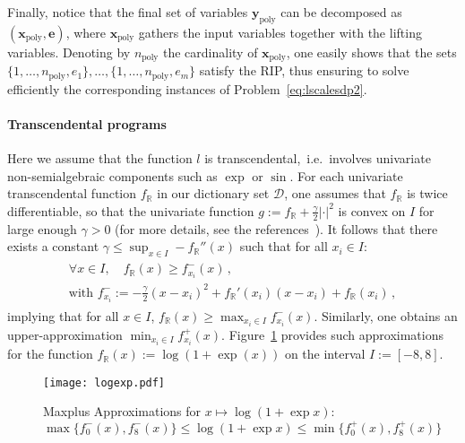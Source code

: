 \documentclass[preprint,fleqn,nocopyrightspace]{sigplanconf}
\newcommand{\setD}{\mathcal{D}} %
\newcommand{\R}{\mathbb{R}}
\newcommand{\x}{\mathbf{x}}
\newcommand{\e}{\mathbf{e}}
\newcommand{\y}{\mathbf{y}}
\newcommand{\poly}{_\text{poly}}
\theoremstyle{plain}
\begin{document}
Finally, notice that the final set of variables $\y\poly$ can be decomposed as $(\x\poly, \e)$, where $\x\poly$ gathers the input variables together with the lifting variables.  
Denoting by $n\poly$ the cardinality of $\x\poly$, one easily shows that the sets $\{1, \dots, n\poly, e_1\},\dots,\{1, \dots, n\poly, e_m\}$ satisfy the RIP, thus ensuring to solve efficiently the corresponding instances of Problem~\eqref{eq:lscalesdp2}.
%
\paragraph{Transcendental programs}
%
Here we assume that the function $l$ is transcendental,~i.e.~involves univariate non-semialgebraic components such as $\exp$ or $\sin$. For each univariate transcendental function $f_{\R}$ in our dictionary set $\setD$, one assumes that $f_{\R}$ is twice differentiable, so that the univariate function $g := f_{\R} + \frac{\gamma}{2} |\cdot|^2$ is convex on $I$ for large enough $\gamma > 0$ (for more details, see the references~\cite{agk04, mceneaney-livre}). It follows that there exists a constant $\gamma \leq \sup_{x\in I} -f_{\R}''(x)$ such that for all $x_i \in I$:
\begin{align}
\begin{split}
\label{eq:maxplus}
\forall x \in I, \quad f_{\R} (x)  \geq f_{x_i}^-(x) \,,\\
\text{with } f_{x_i}^- :=  -\frac{\gamma}{2} (x-x_i)^2 +f_{\R}'(x_i) (x - x_i) + f_{\R} (x_i) \,,
\end{split}
\end{align}
implying that for all $x \in I$, $f_{\R} (x)  \geq \max_{x_i \in I} f_{x_i}^-(x)$. Similarly, one obtains an upper-approximation $\min_{x_i \in I} f_{x_i}^+(x)$.
Figure~\ref{fig:logexp} provides such approximations for the function $f_{\R}(x) := \log (1 + \exp(x))$ on the interval $I := [-8, 8]$.
%
\begin{figure}[!ht]
\begin{center}
\texttt{[image: logexp.pdf]}
\caption{Maxplus Approximations for $x \mapsto \log(1 + \exp{x})$: $\max \{ f_0^- (x), f_8^- (x)\} \leq  \log(1 + \exp{x}) \leq \min \{ f_0^+ (x), f_8^+ (x)\} $}\label{fig:logexp}
\end{center}
\end{figure}
%
\end{document}
